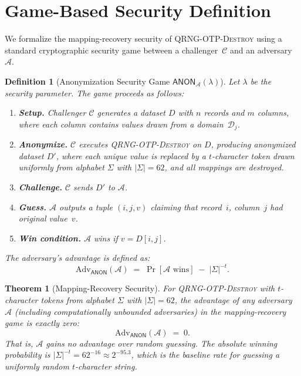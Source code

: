 \documentclass[journal]{IEEEtran}
\newtheorem{theorem}{Theorem}
\newtheorem{definition}{Definition}
\begin{document}
\appendix
\section{Game-Based Security Definition}
\label{app:security-game}

We formalize the mapping-recovery security of \textsc{QRNG-OTP-Destroy} using a standard cryptographic security game between a challenger~$\mathcal{C}$ and an adversary~$\mathcal{A}$.

\begin{definition}[Anonymization Security Game $\mathsf{ANON}_{\mathcal{A}}(\lambda)$]
\label{def:anon-game}
Let $\lambda$ be the security parameter. The game proceeds as follows:
\begin{enumerate}
\item \textbf{Setup.} Challenger $\mathcal{C}$ generates a dataset $D$ with $n$ records and $m$ columns, where each column contains values drawn from a domain~$\mathcal{D}_j$.
\item \textbf{Anonymize.} $\mathcal{C}$ executes \textsc{QRNG-OTP-Destroy} on $D$, producing anonymized dataset $D'$, where each unique value is replaced by a $t$-character token drawn uniformly from alphabet $\Sigma$ with $|\Sigma| = 62$, and all mappings are destroyed.
\item \textbf{Challenge.} $\mathcal{C}$ sends $D'$ to $\mathcal{A}$.
\item \textbf{Guess.} $\mathcal{A}$ outputs a tuple $(i, j, v)$ claiming that record~$i$, column~$j$ had original value~$v$.
\item \textbf{Win condition.} $\mathcal{A}$ wins if $v = D[i,j]$.
\end{enumerate}
The adversary's advantage is defined as:
\begin{equation}
\mathrm{Adv}_{\mathsf{ANON}}(\mathcal{A}) \;=\; \Pr[\mathcal{A}\text{ wins}] \;-\; |\Sigma|^{-t}.
\label{eq:adv-anon}
\end{equation}
\end{definition}

\begin{theorem}[Mapping-Recovery Security]
\label{thm:game-security}
For \textsc{QRNG-OTP-Destroy} with $t$-character tokens from alphabet $\Sigma$ with $|\Sigma| = 62$, the advantage of any adversary $\mathcal{A}$ (including computationally unbounded adversaries) in the mapping-recovery game is exactly zero:
\begin{equation}
\mathrm{Adv}_{\mathsf{ANON}}(\mathcal{A}) \;=\; 0.
\label{eq:adv-bound}
\end{equation}
That is, $\mathcal{A}$ gains no advantage over random guessing. The absolute winning probability is $|\Sigma|^{-t} = 62^{-16} \approx 2^{-95.3}$, which is the baseline rate for guessing a uniformly random $t$-character string.
\end{theorem}
\end{document}
